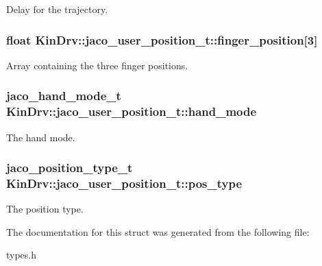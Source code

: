 Delay for the trajectory. \hypertarget{structKinDrv_1_1jaco__user__position__t_a7fd9befb0c71c9b1de3a93c754fa79f2}{
\subsubsection[{finger\+\_\+position}]{\setlength{\rightskip}{0pt plus 5cm}float Kin\+Drv\+::jaco\+\_\+user\+\_\+position\+\_\+t\+::finger\+\_\+position\mbox{[}3\mbox{]}}}\label{structKinDrv_1_1jaco__user__position__t_a7fd9befb0c71c9b1de3a93c754fa79f2}
Array containing the three finger positions. \hypertarget{structKinDrv_1_1jaco__user__position__t_a5eb20d46dbbcf4b9638175f62985c77d}{
\subsubsection[{hand\+\_\+mode}]{\setlength{\rightskip}{0pt plus 5cm}jaco\+\_\+hand\+\_\+mode\+\_\+t Kin\+Drv\+::jaco\+\_\+user\+\_\+position\+\_\+t\+::hand\+\_\+mode}}\label{structKinDrv_1_1jaco__user__position__t_a5eb20d46dbbcf4b9638175f62985c77d}
The hand mode. \hypertarget{structKinDrv_1_1jaco__user__position__t_ad97cb7bd9e3f277a77977f0dddb5b476}{
\subsubsection[{pos\+\_\+type}]{\setlength{\rightskip}{0pt plus 5cm}jaco\+\_\+position\+\_\+type\+\_\+t Kin\+Drv\+::jaco\+\_\+user\+\_\+position\+\_\+t\+::pos\+\_\+type}}\label{structKinDrv_1_1jaco__user__position__t_ad97cb7bd9e3f277a77977f0dddb5b476}
The position type. 

The documentation for this struct was generated from the following file\+:\begin{DoxyCompactItemize}
\item 
types.\+h\end{DoxyCompactItemize}
